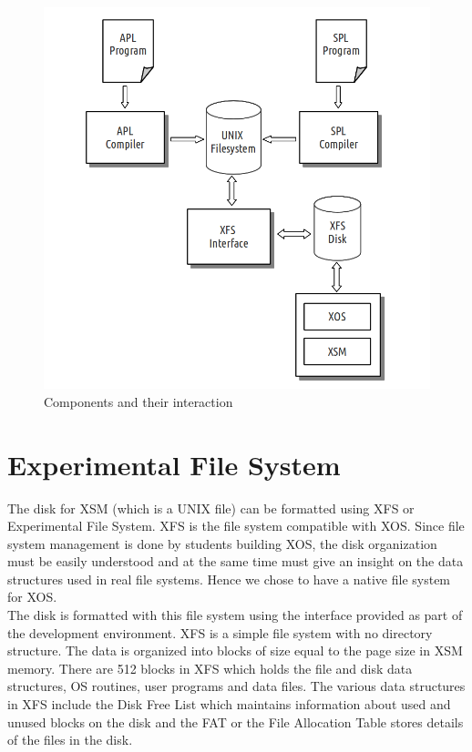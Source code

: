 \documentclass[10pt]{report}
\begin{document}
\begin{figure}[hbtp]
\centering
\includegraphics[scale=0.4]{components.png}
\caption{Components and their interaction}
\end{figure}



\section{Experimental File System }
The disk for XSM (which is a UNIX file) can be formatted using XFS or Experimental File System. XFS is the file system compatible with XOS. Since file system management is done by students building XOS, the disk organization must be easily understood and at the same time must give an insight on the data structures used in real file systems. Hence we chose to have a native file system for XOS.\\

The disk is formatted with this file system using the interface provided as part of the development environment. XFS is a simple file system with no directory structure. The data is organized into blocks of size equal to the page size in XSM memory. There are 512 blocks in XFS which holds the file and disk data structures, OS routines, user programs and data files. The various data structures in XFS include the Disk Free List which maintains information about used and unused blocks on the disk and the FAT or the File Allocation Table stores details of the files in the disk.
\end{document}
